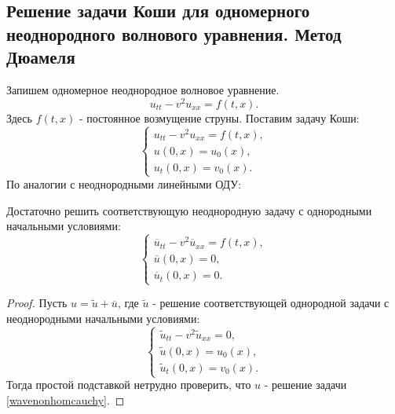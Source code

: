 
\subsection{Решение задачи Коши для одномерного неоднородного волнового уравнения. Метод Дюамеля}
Запишем одномерное неоднородное волновое уравнение.
\begin{equation*}
	u_{tt} - v^2 u_{xx} = f(t,x).
\end{equation*}
Здесь $f(t,x)$ - постоянное возмущение струны. Поставим задачу Коши:
\begin{equation}
	\begin{cases}
		u_{tt} - v^2 u_{xx} = f(t,x), \\
		u(0,x) = u_0(x), \\
		u_t(0,x) = v_0(x).
	\end{cases}
\label{wavenonhomcauchy}
\end{equation}
По аналогии с неоднородными линейными ОДУ:
\begin{note} Достаточно решить соответствующую неоднородную задачу с однородными начальными условиями:
\begin{equation}
	\begin{cases}
		\overline{u}_{tt} - v^2 \overline{u}_{xx} = f(t,x), \\
		\overline{u}(0,x) = 0, \\
		\overline{u}_t(0,x) = 0.
	\end{cases}
\label{wavehomcauchy}
\end{equation}
\end{note}
\begin{proof}
Пусть $u = \widetilde{u} + \overline{u}$, где $\widetilde{u}$ - решение соответствующей однородной задачи с неоднородными начальными условиями:
\begin{equation*}
	\begin{cases}
		\widetilde{u}_{tt} - v^2 \widetilde{u}_{xx} = 0, \\
		\widetilde{u}(0,x) = u_0(x), \\
		\widetilde{u}_t(0,x) = v_0(x).
	\end{cases}
\end{equation*}
Тогда простой подставкой нетрудно проверить, что $u$ - решение задачи \eqref{wavenonhomcauchy}.

\end{proof}
